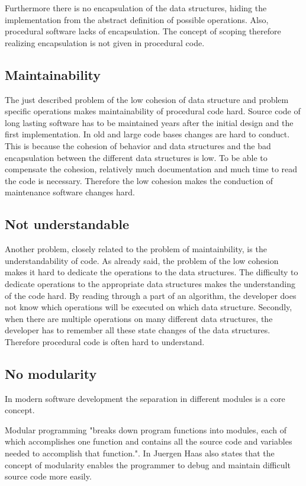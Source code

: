 Furthermore there is no encapsulation of the data structures, hiding the implementation from the abstract definition of possible operations. Also, procedural software lacks of encapsulation. The concept of scoping therefore realizing encapsulation is not given in procedural code. 

\subsection*{Maintainability}
\label{problem:maintainability}
The just described problem of the low cohesion of data structure and problem specific operations makes maintainability of procedural code hard. Source code of long lasting software has to be maintained years after the initial design and the first implementation. In old and large code bases changes are hard to conduct. This is because the cohesion of behavior and data structures and the bad encapsulation between the different data structures is low. To be able to compensate the cohesion, relatively much documentation and much time to read the code is necessary. Therefore the low cohesion makes the conduction of maintenance software changes hard. 

\subsection*{Not understandable}
Another problem, closely related to the problem of maintainbility, is the understandability of code. As already said, the problem of the low cohesion makes it hard to dedicate the operations to the data structures. The difficulty to dedicate operations to the appropriate data structures makes the understanding of the code hard. By  reading through a part of an algorithm, the developer does not know which operations will be executed on which data structure. Secondly, when there are multiple operations on many different data structures, the developer has to remember all these state changes of the data structures. Therefore procedural code is often hard to understand. 

\subsection*{No modularity}
In modern software development the separation in different modules is a core concept.

Modular programming "breaks down program functions into modules, each of which accomplishes one function and contains all the source code and variables needed to accomplish that function."\cite{about}. In \cite{about} Juergen Haas also states that the concept of modularity enables the programmer to debug and maintain difficult source code more easily. 

